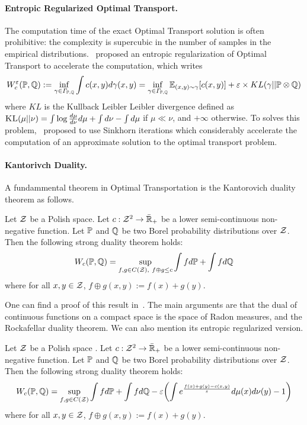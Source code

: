 \paragraph{Entropic Regularized Optimal Transport.} The computation time of the exact Optimal Transport solution is often prohibitive: the complexity is supercubic in the number of samples in the empirical distributions.~\cite{cuturi2013sinkhorn,peyre2019computational} proposed an entropic regularization of Optimal Transport to accelerate the computation, which writes
\begin{align*}
    W_c^\varepsilon(\PP,\QQ):=\inf_{\gamma\in\Gamma_{\PP,\QQ}}\int c(x,y) d\gamma(x,y) = \inf_{\gamma\in\Gamma_{\PP,\QQ}}\mathbb{E}_{(x,y)\sim\gamma}\left[c(x,y) \right] +\varepsilon\times KL(\gamma||\PP\otimes \QQ)
\end{align*} 
where $KL$ is the Kullback Leibler Leibler divergence defined as $\textsc{KL}(\mu||\nu) = \int\log{\frac{d\mu}{d\nu}}d\mu+\int  d\nu - \int d\mu$  if $\mu\ll \nu$, and $+\infty$ otherwise. To solves this problem,~\cite{cuturi2013sinkhorn} proposed to use Sinkhorn iterations which considerably accelerate the computation of an approximate solution to the optimal transport problem.

\paragraph{Kantorivch Duality.} A fundammental theorem in Optimal Transportation is the Kantorovich duality theorem as follows.

\begin{thm}
    Let $\mathcal{Z}$ be a Polish space. Let $c:\mathcal{Z}^2\to\bar{\mathbb{R}}_+$ be a lower semi-continuous non-negative function. Let $\mathbb{P}$ and $\mathbb{Q}$ be two Borel probability distributions over $\mathcal{Z}$. Then   the following strong duality theorem holds:
\begin{align*}
    W_c(\mathbb{P},\mathbb{Q})=\sup_{f,g\in C(\mathcal{Z}),~f\oplus g\leq c}   \int fd\mathbb{P}+\int fd\mathbb{Q}
\end{align*}
where for all $x,y\in\mathcal{Z}$, $f\oplus g(x,y):=f(x)+g(y)$. 
\end{thm}
One can find a proof of this result in~\citep{villani2003topics}. The main arguments are that the dual of continuous functions on  a compact space is the space of Radon measures, and the Rockafellar duality theorem.  We can also mention its entropic regularized version.


\begin{thm}
    Let $\mathcal{Z}$ be a Polish space . Let $c:\mathcal{Z}^2\to\bar{\mathbb{R}}_+$ be a lower semi-continuous non-negative function. Let $\mathbb{P}$ and $\mathbb{Q}$ be two Borel probability distributions over $\mathcal{Z}$. Then   the following strong duality theorem holds:
\begin{align*}
    W_c(\PP,\QQ)=\sup_{f,g\in C(\ZZ)}   \int fd\PP+\int fd\QQ -\varepsilon\left( \int e^{\frac{f(x)+g(y)-c(x,y)}{\varepsilon}}d\mu(x)d\nu(y)-1\right)
\end{align*}
where for all $x,y\in\mathcal{Z}$, $f\oplus g(x,y):=f(x)+g(y)$. 
\end{thm}


